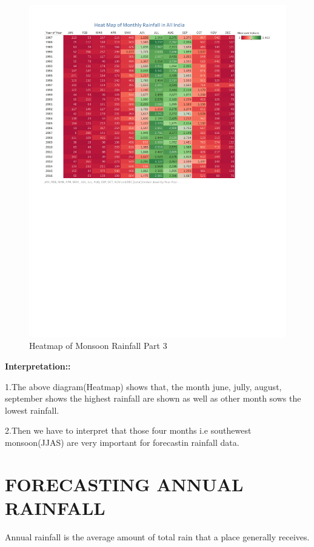 \documentclass[12pt,openany]{book}
\begin{document}
\begin{figure}
\centering
\includegraphics{Rainfall_Heatmap_3.pdf}
\caption{\label{fig:unnamed-chunk-14}Heatmap of Monsoon Rainfall Part 3}
\end{figure}

\textbf{Interpretation::}

1.The above diagram(Heatmap) shows that, the month june, jully, august, september shows the highest rainfall are shown as well as other month sows the lowest rainfall.

2.Then we have to interpret that those four months i.e southewest monsoon(JJAS) are very important for forecastin rainfall data.

\hypertarget{forecasting-annual-rainfall}{%
\chapter{FORECASTING ANNUAL RAINFALL}\label{forecasting-annual-rainfall}}

Annual rainfall is the average amount of total rain that a place generally receives.
\end{document}
